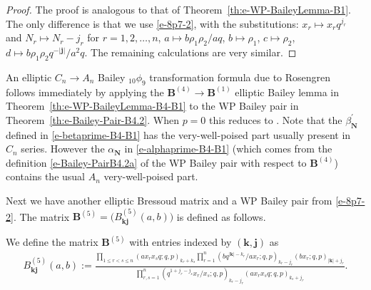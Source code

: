 \documentclass[pdftex]{sigma}
\numberwithin{equation}{section}
\newcommand\sumj{{\left| \boldsymbol {j} \right|}}
\newcommand\sumk{{\left| \boldsymbol{k} \right|}}
\newcommand{\B}{{ \mathbf B}}
\newcommand{\N}{{ \boldsymbol N}}
\renewcommand{\k}{{ \boldsymbol{k}}}
\renewcommand{\j}{{ \boldsymbol{j}}}
\newcommand{\triprod}[1]{\prod\limits_{1\le r < s \le #1}}
\newcommand{\sqprod}[1]{\prod\limits_{r, s =1}^{#1}} %
\newcommand{\smallprod}[1]{\prod\limits_{r =1}^{#1}} %
\newcommand{\xover}[1]{#1_{r}/#1_{s}}
\newcommand{\ellipticqrfac}[2]{{\left({#1}; q, p\right)_{#2}}} %
\begin{document}
\begin{proof} The proof is analogous to that of Theorem~\ref{th:e-WP-BaileyLemma-B1}. The only difference is that we use \eqref{e-8p7-2}, with the substitutions: $x_r\mapsto x_rq^{j_r}$ and $N_r\mapsto N_r-j_r$ for $r=1, 2, \dots, n$,
$a\mapsto b\rho_1\rho_2/aq$, $b\mapsto \rho_1$,
$c\mapsto \rho_2$,
$d\mapsto b\rho_1\rho_2q^{-\sumj}/a^2q $. The remaining calculations are very similar.
\end{proof}

\begin{Remark} \label{rem:B4-B1-10p9}
An elliptic $C_n\to A_n$ Bailey $_{10}\phi_9$ transformation formula due to Rosengren~\cite[Corollary~8.3]{HR2004} follows immediately by applying the $\B^{(4)}\to\B^{(1)}$ elliptic Bailey lemma in Theorem~\ref{th:e-WP-BaileyLemma-B4-B1} to the WP Bailey pair in
Theorem~\ref{th:e-Bailey-Pair-B4.2}. When $p=0$ this reduces to \cite[Theorem~2.1]{BS1998}. Note that the $\beta^{\prime}_\N$ defined in \eqref{e-betaprime-B4-B1} has the very-well-poised part usually present in $C_n$ series. However the $\alpha_\N$ in \eqref{e-alphaprime-B4-B1} (which comes from the definition \eqref{e-Bailey-PairB4.2a} of the WP Bailey pair with respect to $\B^{(4)}$) contains the usual $A_n$ very-well-poised part.
\end{Remark}

Next we have another elliptic Bressoud matrix and a WP Bailey pair from \eqref{e-8p7-2}. The matrix $\B^{(5)}= \big(B^{(5)}_{\k\j}(a,b)\big)$ is defined as follows.
\begin{Definition} We define the matrix $\B^{(5)}$ with entries indexed by $(\k , \j)$ as
\begin{gather}
B^{(5)}_{\k \j}(a,b) := \frac{\triprod n \ellipticqrfac{ax_rx_sq}{k_r+k_s}
 \smallprod n \ellipticqrfac{bq^{\sumk-k_r}/ax_r}{k_r-j_r} \ellipticqrfac{bx_r}{\sumk+j_r} } {\sqprod n \ellipticqrfac{q^{1+j_r-j_s}\xover x }{k_r-j_r} \ellipticqrfac{ax_rx_sq}{k_s+j_r} }.\label{e-B5}
\end{gather}
\end{Definition}
\end{document}
